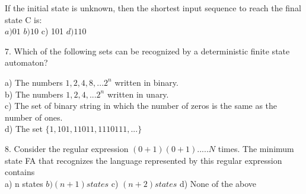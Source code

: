 \documentclass[9pt]{beamer}
\begin{document}
\begin{frame}
\vspace*{3mm}
\hspace{0.5cm}
If the initial state is unknown, then the shortest input sequence to reach the final state C is:\\

\vspace*{0.2cm}
\hspace{0.5cm}
$a) 01$  \hspace*{0.5cm}  $b) 10$  \hspace*{0.5cm}   c) 101  \hspace*{0.5cm}  $d) 110$ \\
\vspace*{0.2cm}

\vspace*{0.2cm}
7. Which of the following sets can be recognized by a deterministic finite state automaton?\\

\vspace*{3mm}

\hspace{0.5cm}
a) The numbers $1, 2, 4, 8, . . . 2 ^{n}$ written in binary.\\
\hspace{0.5cm}
b) The numbers $1, 2, 4, . . . 2 ^{n}$ written in unary.\\
\hspace{0.5cm}
c) The set of binary string in which the number of zeros is the same as the number of ones.\\
\hspace{0.5cm}
d) The set $\{1, 101, 11011, 1110111, . . .\}$ \\

\vspace*{3mm}

8. Consider the regular expression $(0 + 1)(0 + 1) . . . . . N$ times. The minimum state FA that recognizes
the language represented by this regular expression contains\\

\vspace*{0.2cm}
\hspace{0.5cm}
a) n states  \hspace*{0.5cm}  $b) (n + 1) states$  \hspace*{0.5cm}   c) $(n + 2) states$  \hspace*{0.5cm}  d) None of the above \\
\vspace*{0.2cm}

\end{frame}
\end{document}
